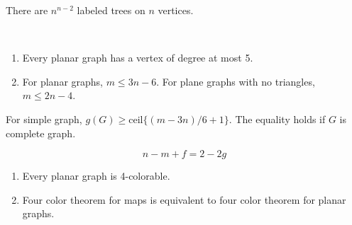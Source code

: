 \documentclass[12pt]{article}
\begin{document}
\begin{theorem}
	There are $n^{n-2}$ labeled trees on $n$ vertices.
\end{theorem}

\begin{theorem}[Planarity]
	\ 
	\begin{enumerate}
		\item Every planar graph has a vertex of degree at most 5.
		\item For planar graphs, $ m \leq 3n - 6$. For plane graphs with no triangles, $m \leq 2n - 4$.
	\end{enumerate}
\end{theorem}

\begin{theorem}[Genus]
	For simple graph, $g(G) \geq \text{ceil} \{(m-3n)/6 +1 \}$. The equality holds if $G$ is complete graph.
\end{theorem}

\begin{theorem}[Euler]
	\begin{equation}
		n - m + f = 2 - 2g	
	\end{equation}
\end{theorem}

\begin{theorem}[Coloring]
	\begin{enumerate}
		\item Every planar graph is 4-colorable.
		\item Four color theorem for maps is equivalent to four color theorem for planar graphs.
	\end{enumerate}
\end{theorem}
\end{document}
